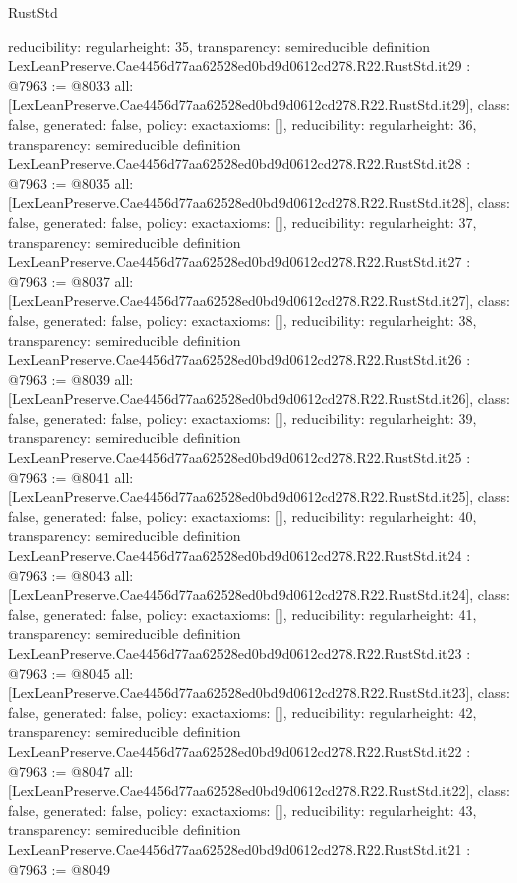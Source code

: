 \begin{lexlean}{RustStd}
\begin{coremodule}
{  reducibility: regular{height: 35},
  transparency: semireducible
}
definition LexLeanPreserve.Cae4456d77aa62528ed0bd9d0612cd278.R22.RustStd.it29 : @7963 := @8033 {
  all: [LexLeanPreserve.Cae4456d77aa62528ed0bd9d0612cd278.R22.RustStd.it29],
  class: false,
  generated: false,
  policy: exact{axioms: []},
  reducibility: regular{height: 36},
  transparency: semireducible
}
definition LexLeanPreserve.Cae4456d77aa62528ed0bd9d0612cd278.R22.RustStd.it28 : @7963 := @8035 {
  all: [LexLeanPreserve.Cae4456d77aa62528ed0bd9d0612cd278.R22.RustStd.it28],
  class: false,
  generated: false,
  policy: exact{axioms: []},
  reducibility: regular{height: 37},
  transparency: semireducible
}
definition LexLeanPreserve.Cae4456d77aa62528ed0bd9d0612cd278.R22.RustStd.it27 : @7963 := @8037 {
  all: [LexLeanPreserve.Cae4456d77aa62528ed0bd9d0612cd278.R22.RustStd.it27],
  class: false,
  generated: false,
  policy: exact{axioms: []},
  reducibility: regular{height: 38},
  transparency: semireducible
}
definition LexLeanPreserve.Cae4456d77aa62528ed0bd9d0612cd278.R22.RustStd.it26 : @7963 := @8039 {
  all: [LexLeanPreserve.Cae4456d77aa62528ed0bd9d0612cd278.R22.RustStd.it26],
  class: false,
  generated: false,
  policy: exact{axioms: []},
  reducibility: regular{height: 39},
  transparency: semireducible
}
definition LexLeanPreserve.Cae4456d77aa62528ed0bd9d0612cd278.R22.RustStd.it25 : @7963 := @8041 {
  all: [LexLeanPreserve.Cae4456d77aa62528ed0bd9d0612cd278.R22.RustStd.it25],
  class: false,
  generated: false,
  policy: exact{axioms: []},
  reducibility: regular{height: 40},
  transparency: semireducible
}
definition LexLeanPreserve.Cae4456d77aa62528ed0bd9d0612cd278.R22.RustStd.it24 : @7963 := @8043 {
  all: [LexLeanPreserve.Cae4456d77aa62528ed0bd9d0612cd278.R22.RustStd.it24],
  class: false,
  generated: false,
  policy: exact{axioms: []},
  reducibility: regular{height: 41},
  transparency: semireducible
}
definition LexLeanPreserve.Cae4456d77aa62528ed0bd9d0612cd278.R22.RustStd.it23 : @7963 := @8045 {
  all: [LexLeanPreserve.Cae4456d77aa62528ed0bd9d0612cd278.R22.RustStd.it23],
  class: false,
  generated: false,
  policy: exact{axioms: []},
  reducibility: regular{height: 42},
  transparency: semireducible
}
definition LexLeanPreserve.Cae4456d77aa62528ed0bd9d0612cd278.R22.RustStd.it22 : @7963 := @8047 {
  all: [LexLeanPreserve.Cae4456d77aa62528ed0bd9d0612cd278.R22.RustStd.it22],
  class: false,
  generated: false,
  policy: exact{axioms: []},
  reducibility: regular{height: 43},
  transparency: semireducible
}
definition LexLeanPreserve.Cae4456d77aa62528ed0bd9d0612cd278.R22.RustStd.it21 : @7963 := @8049 {
}
\end{coremodule}
\end{lexlean}
